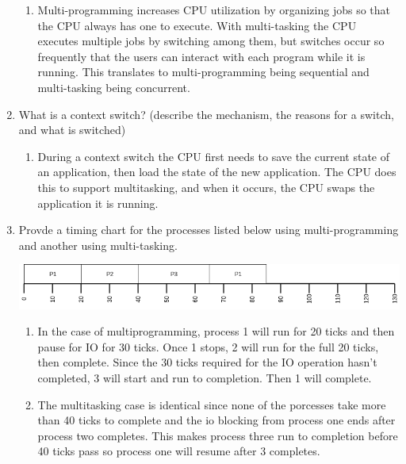 \documentclass[a4paper, 11pt]{article}
\begin{document}
\begin{enumerate}
  \begin{enumerate}
    \item Multi-programming increases CPU utilization by organizing jobs so that the CPU always has one to execute. With multi-tasking the CPU executes multiple jobs by switching among them, but switches occur so frequently that the users can interact with each program while it is running. This translates to multi-programming being sequential and multi-tasking being concurrent.
  \end{enumerate}
  \item What is a context switch? (describe the mechanism, the reasons for a switch, and what is switched)
  \begin{enumerate}
    \item During a context switch the CPU first needs to save the current state of an application, then load the state of the new application. The CPU does this to support multitasking, and when it occurs, the CPU swaps the application it is running.
  \end{enumerate}
  \item Provde a timing chart for the processes listed below using multi-programming and another using multi-tasking.

  \includegraphics[width=\linewidth]{OS_HW1.png}
  \begin{enumerate}
    \item In the case of multiprogramming, process 1 will run for 20 ticks and then pause for IO for 30 ticks. Once 1 stops, 2 will run for the full 20 ticks, then complete. Since the 30 ticks required for the IO operation hasn't completed, 3 will start and run to completion. Then 1 will complete.
    \item The multitasking case is identical since none of the porcesses take more than 40 ticks to complete and the io blocking from process one ends after process two completes. This makes process three run to completion before 40 ticks pass so process one will resume after 3 completes.
  \end{enumerate}
\end{enumerate}
\end{document}
